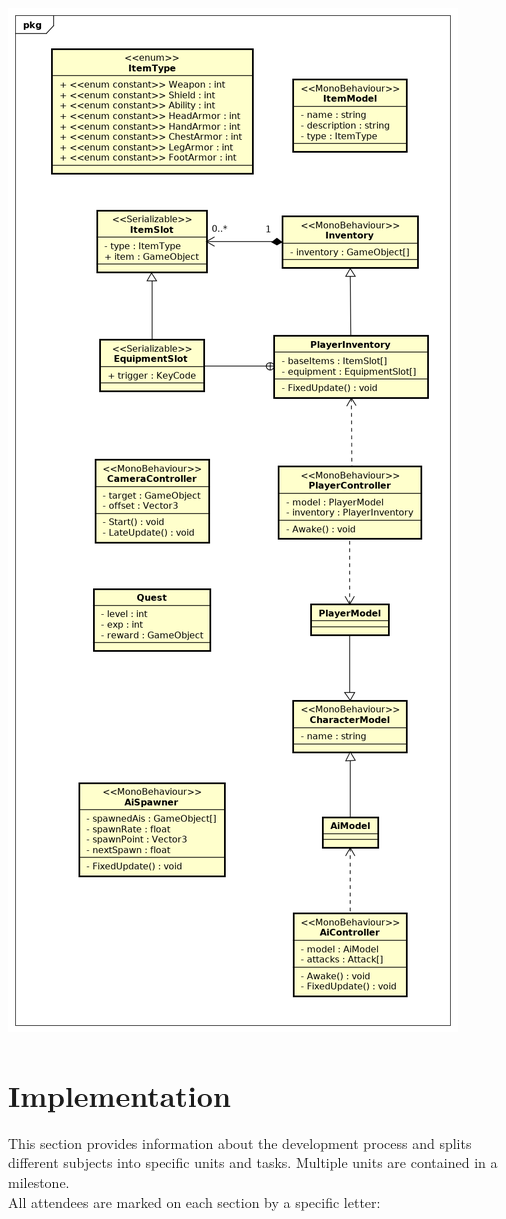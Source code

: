 \documentclass[11pt]{article}
\begin{document}
\begin{center}
 \includegraphics[height=\textheight]{./data.png}
\end{center}

\section{Implementation}
This section provides information about the development process and splits different subjects into specific units and tasks.
Multiple units are contained in a milestone.
\bigskip\\
All attendees are marked on each section by a specific letter:
\end{document}
